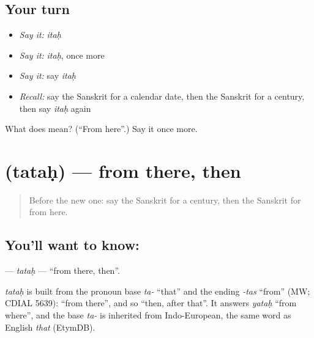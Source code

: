 \subsection*{Your turn}
\begin{itemize}
\raggedright
  \item \emph{Say it:} \emph{itaḥ}
  \item \emph{Say it:} \emph{itaḥ}, once more
  \item \emph{Say it:} say \emph{itaḥ}
  \item \emph{Recall:} say the Sanskrit for a calendar date, then the Sanskrit for a century, then say \emph{itaḥ} again
\end{itemize}

\begin{tcolorbox}[breakable,colback=teal!4,colframe=teal!35!black,title={Before you move on}]
What does  mean? (\textquotedblleft{}From here\textquotedblright{}.) Say it once more.
\end{tcolorbox}
\section[\texorpdfstring{\sk{ततः} (tataḥ)}{ततः (tataḥ)}]{ (tataḥ) — from there, then}

\label{lesson:SA-C153-tatah}



\begin{quote}
Before the new one: say the Sanskrit for a century, then the Sanskrit for from here.
\end{quote}

\subsection*{You'll want to know: }
\textbf{} — \emph{tataḥ} — \textquotedblleft{}from there, then\textquotedblright{}.

\begin{cousinweb}
\emph{tataḥ} is built from the pronoun base \emph{ta-} \textquotedblleft{}that\textquotedblright{} and the ending \emph{-tas} \textquotedblleft{}from\textquotedblright{} (MW; CDIAL 5639): \textquotedblleft{}from there\textquotedblright{}, and so \textquotedblleft{}then, after that\textquotedblright{}. It answers \emph{yataḥ} \textquotedblleft{}from where\textquotedblright{}, and the base \emph{ta-} is inherited from Indo-European, the same word as English \emph{that} (EtymDB).
\end{cousinweb}

